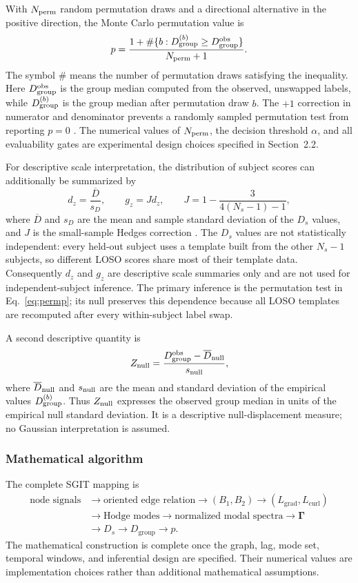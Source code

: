 \documentclass[12pt]{article}
\begin{document}
With $N_{\rm perm}$ random permutation draws and a directional alternative in the positive direction, the Monte Carlo permutation value is
\begin{equation}
p=\frac{1+\#\{b:D_{\mathrm{group}}^{(b)}\ge D_{\mathrm{group}}^{\mathrm{obs}}\}}{N_{\rm perm}+1}.
\label{eq:permp}
\end{equation}
The symbol $\#$ means the number of permutation draws satisfying the inequality. Here $D_{\rm group}^{\rm obs}$ is the group median computed from the observed, unswapped labels, while $D_{\rm group}^{(b)}$ is the group median after permutation draw $b$. The $+1$ correction in numerator and denominator prevents a randomly sampled permutation test from reporting $p=0$ \citep{PhipsonSmyth2010}. The numerical values of $N_{\rm perm}$, the decision threshold $\alpha$, and all evaluability gates are experimental design choices specified in Section~2.2.

For descriptive scale interpretation, the distribution of subject scores can additionally be summarized by
\[
d_z=\frac{\overline D}{s_D},\qquad g_z=Jd_z,\qquad J=1-\frac{3}{4(N_s-1)-1},
\]
where $\overline D$ and $s_D$ are the mean and sample standard deviation of the $D_s$ values, and $J$ is the small-sample Hedges correction \citep{Lakens2013}. The $D_s$ values are not statistically independent: every held-out subject uses a template built from the other $N_s-1$ subjects, so different LOSO scores share most of their template data. Consequently $d_z$ and $g_z$ are descriptive scale summaries only and are not used for independent-subject inference. The primary inference is the permutation test in Eq.~\ref{eq:permp}; its null preserves this dependence because all LOSO templates are recomputed after every within-subject label swap.

A second descriptive quantity is
\[
Z_{\rm null}=\frac{D_{\rm group}^{\rm obs}-\overline D_{\rm null}}{s_{\rm null}},
\]
where $\overline D_{\rm null}$ and $s_{\rm null}$ are the mean and standard deviation of the empirical values $D_{\rm group}^{(b)}$. Thus $Z_{\rm null}$ expresses the observed group median in units of the empirical null standard deviation. It is a descriptive null-displacement measure; no Gaussian interpretation is assumed.

\subsubsection{Mathematical algorithm}
The complete SGIT mapping is
\[
\begin{aligned}
\text{node signals} &\rightarrow \text{oriented edge relation} \rightarrow (B_1,B_2) \rightarrow (L_{\mathrm{grad}},L_{\mathrm{curl}})\\
&\rightarrow \text{Hodge modes} \rightarrow \text{normalized modal spectra} \rightarrow \bm\Gamma\\
&\rightarrow D_s \rightarrow D_{\mathrm{group}} \rightarrow p.
\end{aligned}
\]
The mathematical construction is complete once the graph, lag, mode set, temporal windows, and inferential design are specified. Their numerical values are implementation choices rather than additional mathematical assumptions.
\end{document}

